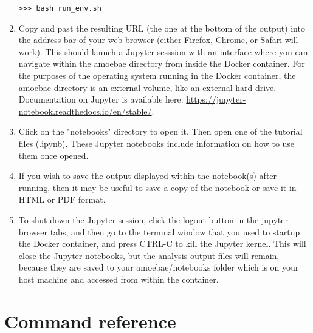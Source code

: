 \documentclass[12pt,letterpaper]{article}
\begin{document}
\begin{linenumbers}
\begin{enumerate}
\begin{lstlisting}
>>> bash run_env.sh
\end{lstlisting}


\item Copy and past the resulting URL (the one at the bottom of the output)
    into the address bar of your web browser (either Firefox, Chrome, or Safari
    will work). This should launch a Jupyter sesssion with an interface where
    you can navigate within the amoebae directory from inside the Docker
    container.  For the purposes of the operating system running in the Docker
    container, the amoebae directory is an external volume, like an external
    hard drive. Documentation on Jupyter is available here:
    \url{https://jupyter-notebook.readthedocs.io/en/stable/}. 



\item Click on the "notebooks" directory to open it. Then open one of the
    tutorial files (.ipynb). These Jupyter notebooks include information on how
    to use them once opened.


\item If you wish to save the output displayed within the notebook(s) after
    running, then it may be useful to save a copy of the notebook or save it in
    HTML or PDF format.


\item To shut down the Jupyter session, click the logout button in the jupyter
    browser tabs, and then go to the terminal window that you used to startup
    the Docker container, and press CTRL-C to kill the Jupyter kernel. This
    will close the Jupyter notebooks, but the analysis output files will
    remain, because they are saved to your amoebae/notebooks folder which is on
    your host machine and accessed from within the container.


\end{enumerate}

\section{Command reference}


\end{linenumbers}
\end{document}

